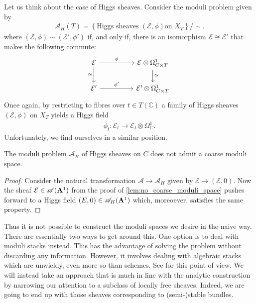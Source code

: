 \documentclass[12pt]{ociamthesis}  %
\begin{document}
Let us think about the case of Higgs sheaves. Consider the moduli problem
given by 
\begin{align*}
  \mathscr A_H(T) = \left\lbrace{\text{Higgs sheaves $(\mathcal E,\phi)$
  on $X_T$}}\right\rbrace/\sim.
\end{align*}
where $(\mathcal E,\phi)\sim(\mathcal E',\phi')$ if, and only if,
there is an isomorphism $\mathcal E\cong\mathcal E'$ that makes the
following commute:
\begin{equation*}
  \begin{tikzcd}
    {\mathcal E} && {\mathcal E\otimes \Omega^1_{C\times T}} \\
    {\mathcal E'} && {\mathcal E'\otimes\Omega^1_{C\times T}}
    \arrow["\phi", from=1-1, to=1-3]
    \arrow["\cong"', from=1-1, to=2-1]
    \arrow["\cong", from=1-3, to=2-3]
    \arrow["{\phi'}", from=2-1, to=2-3]
  \end{tikzcd}
\end{equation*}
Once again, by restricting to fibres over $t\in T(\mathbb{C})$
a family of Higgs sheaves $(\mathcal E,\phi)$ on $X_T$ yields
a Higgs field
\begin{align*}
  \phi_t : \mathcal E_t \to \mathcal E_t \otimes \Omega^1_C.
\end{align*}
Unfortunately, we find ourselves in a similar position.
\begin{corollary}
  The moduli problem $\mathscr A_H$ of Higgs sheaves on $C$ does not admit
  a coarse moduli space.
  \begin{proof}
    Consider the natural transformation $\mathscr A\to\mathscr A_H$
    given by $\mathcal E \mapsto (\mathcal E,0)$. Now the sheaf
    $\mathcal E\in\mathscr A(\mathbf{A}^{1}_{})$ from the proof of
    \ref{lem:no_coarse_moduli_space} pushes forward to a Higgs field
    $(E,0)\in\mathscr A_H(\mathbf{A}^{1}_{})$ which, moreoever, satisfies the
    same property.
  \end{proof}
\end{corollary}
Thus it is not possible to construct the moduli spaces we desire
in the naive way. There are essentially two ways to get around this.
One option is to deal with
moduli stacks instead. This has the advantage of solving the problem
without discarding any information. However, it involves dealing with
algebraic stacks which are unwieldy, even more so than schemes.
See \cite{cm2017} for this point of view. We will instead take an
approach that is much in line with the analytic construction by narrowing
our attention to a subclass of locally free sheaves. Indeed, we are
going to end up with those sheaves corresponding to (semi-)stable
bundles.
\end{document}

